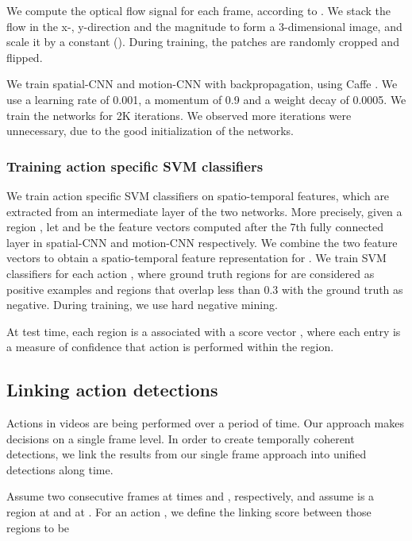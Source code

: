 \documentclass[10pt,twocolumn,letterpaper]{article}
\makeatletter
\renewcommand{\paragraph}{\@startsection{paragraph}{4}{\z@}{1.5ex \@plus 1ex \@minus .2ex}{-0.5em}{\normalfont\normalsize\bfseries}}
\makeatother
\begin{document}
 We compute the optical flow signal for each frame, according to \cite{Brox2004}. We stack the flow in the x-, y-direction and the magnitude to form a 3-dimensional image, and scale it by a constant (). During training, the patches are randomly cropped and flipped.

\paragraph{Parameters}

We train spatial-CNN and motion-CNN with backpropagation, using Caffe \cite{jia2014caffe}. We use a learning rate of 0.001, a momentum of 0.9 and a weight decay of 0.0005. We train the networks for 2K iterations. We observed more iterations were unnecessary, due to the good initialization of the networks. 

\subsubsection{Training action specific SVM classifiers}

We train action specific SVM classifiers on spatio-temporal features, which are extracted from an intermediate layer of the two networks. More precisely, given a region , let  and  be the feature vectors computed after the 7th fully connected layer in spatial-CNN and motion-CNN respectively. We combine the two feature vectors  to obtain a spatio-temporal feature representation for . We train SVM classifiers  for each action , where ground truth regions for  are considered as positive examples and regions that overlap less than 0.3 with the ground truth as negative. During training, we use hard negative mining.

At test time, each region  is a associated with a score vector , where each entry is a measure of confidence that action  is performed within the region.

\subsection{Linking action detections}

Actions in videos are being performed over a period of time. Our approach makes decisions on a single frame level. In order to create temporally coherent detections, we link the results from our single frame approach into unified detections along time.

Assume two consecutive frames at times  and , respectively, and assume  is a region at  and  at . For an action , we define the linking score between those regions to be
\end{document}
